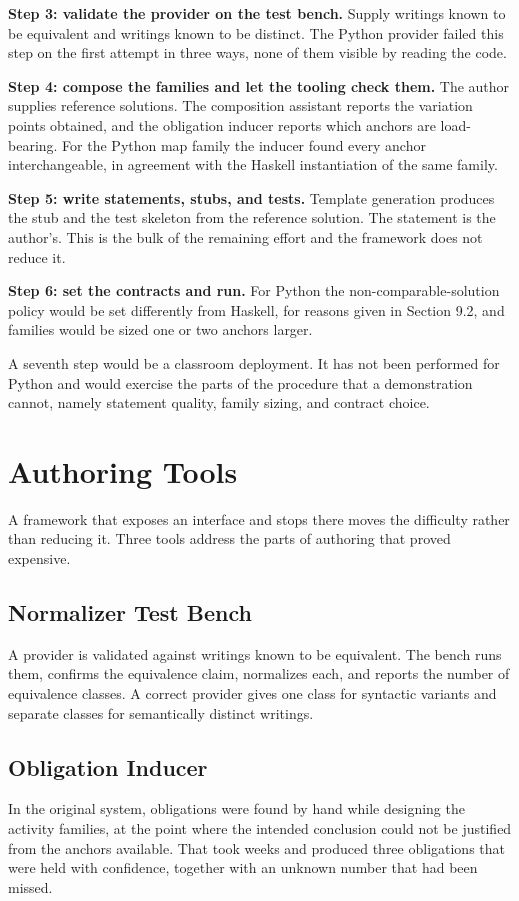 \documentclass[10pt,twocolumn,letterpaper]{article}
\begin{document}
\textbf{Step 3: validate the provider on the test bench.} Supply writings known to be equivalent and writings known to be distinct. The Python provider failed this step on the first attempt in three ways, none of them visible by reading the code.

\textbf{Step 4: compose the families and let the tooling check them.} The author supplies reference solutions. The composition assistant reports the variation points obtained, and the obligation inducer reports which anchors are load-bearing. For the Python map family the inducer found every anchor interchangeable, in agreement with the Haskell instantiation of the same family.

\textbf{Step 5: write statements, stubs, and tests.} Template generation produces the stub and the test skeleton from the reference solution. The statement is the author's. This is the bulk of the remaining effort and the framework does not reduce it.

\textbf{Step 6: set the contracts and run.} For Python the non-comparable-solution policy would be set differently from Haskell, for reasons given in Section 9.2, and families would be sized one or two anchors larger.

A seventh step would be a classroom deployment. It has not been performed for Python and would exercise the parts of the procedure that a demonstration cannot, namely statement quality, family sizing, and contract choice.

\section{Authoring Tools}
A framework that exposes an interface and stops there moves the difficulty rather than reducing it. Three tools address the parts of authoring that proved expensive.

\subsection{Normalizer Test Bench}
A provider is validated against writings known to be equivalent. The bench runs them, confirms the equivalence claim, normalizes each, and reports the number of equivalence classes. A correct provider gives one class for syntactic variants and separate classes for semantically distinct writings.

\subsection{Obligation Inducer}
In the original system, obligations were found by hand while designing the activity families, at the point where the intended conclusion could not be justified from the anchors available. That took weeks and produced three obligations that were held with confidence, together with an unknown number that had been missed.
\end{document}
